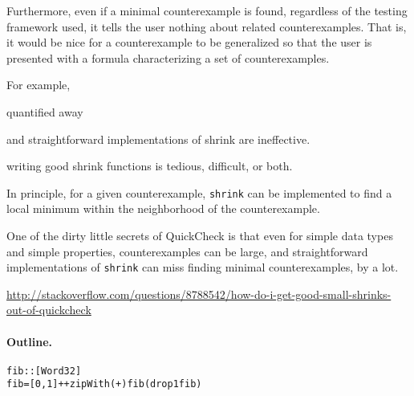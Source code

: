 \documentclass[9pt]{sigplanconf}
\newenvironment{code}{\begin{alltt}\footnotesize}{\end{alltt}}
\newcommand{\ttp}[1]{\texttt{#1}}
\begin{document}
Furthermore, even if a minimal counterexample is found, regardless of the testing
framework used, it tells the user nothing about related counterexamples.  That
is, it would be nice for a counterexample to be generalized so that the user is
presented with a formula characterizing a set of counterexamples.  

For
example, 

quantified away

and straightforward
implementations of shrink are ineffective.

writing good shrink functions is tedious, difficult, or
both.  

In principle, for a given counterexample, \ttp{shrink} can be implemented to
find a local minimum within the neighborhood of the counterexample.  



One of the
dirty little secrets of QuickCheck is that even for simple data types and simple
properties, counterexamples can be large, and straightforward implementations of
\ttp{shrink} can miss finding minimal counterexamples, by a lot.








\url{http://stackoverflow.com/questions/8788542/how-do-i-get-good-small-shrinks-out-of-quickcheck}

\paragraph{Outline.}


\begin{code}
fib :: [Word32]
fib = [0,1] ++ zipWith (+) fib (drop 1 fib)
\end{code}
%
\end{document}
